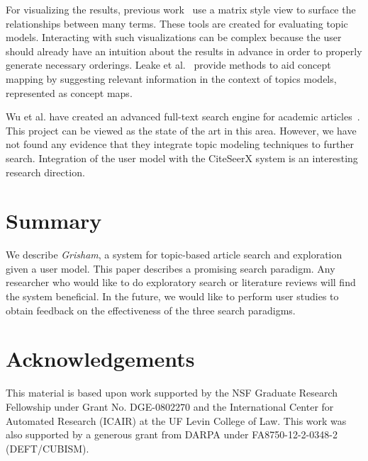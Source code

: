 \documentclass[letterpaper]{article}
\newcommand{\system}{\textsl{Grisham}\xspace}
\begin{document}
For visualizing the results, previous work~\cite{2012-termite,bertin1983semiology,henry2007matlink} use
 a matrix style view to surface the relationships between many terms. 
These tools are created for evaluating topic models.
Interacting with such visualizations can be complex because the user should
already have an intuition about the results in advance in order to properly generate necessary
orderings.
Leake et al.~\cite{leake2003topic} provide methods to aid concept mapping by suggesting relevant information in the context of topics models, represented as concept maps. 

Wu et al. have created an advanced full-text search engine for academic articles~\cite{wu2014citeseerx}.
This project can be viewed as the state of the art in this area.
However, we have not found any evidence that they integrate topic modeling techniques to further search.
Integration of the user model with the CiteSeerX system is an interesting research direction.




\section{Summary}
\label{sec:summary}

We describe \system, a system for topic-based article search
and exploration given a user model.
This paper describes a promising search paradigm.
Any researcher who would like to do exploratory search or literature 
reviews will find the system beneficial. In the future, 
we would like to perform user studies to obtain feedback on the 
effectiveness of the three search paradigms.


\section{Acknowledgements}

This material is based upon work supported by the NSF Graduate 
Research Fellowship under Grant No. 
DGE-$0802270$ and the International Center for Automated 
Research (ICAIR) at the UF Levin College of Law. 
This work was also supported by a generous grant from DARPA under
FA8750-12-2-0348-2 (DEFT/CUBISM).




\end{document}
